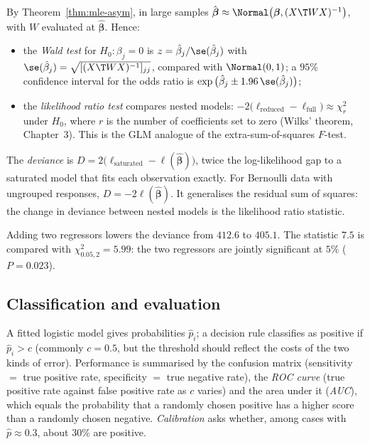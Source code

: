 By Theorem~\ref{thm:mle-asym}, in large samples $\hat{\boldsymbol\beta}\approx\Normal\big(\boldsymbol\beta,(X\T WX)^{-1}\big)$, with $W$ evaluated at $\hat{\boldsymbol\beta}$. Hence:
\begin{itemize}
  \item the \emph{Wald test} for $H_0:\beta_j=0$ is $z=\hat\beta_j/\se(\hat\beta_j)$ with $\se(\hat\beta_j)=\sqrt{[(X\T WX)^{-1}]_{jj}}$, compared with $\Normal(0,1)$; a $95\%$ confidence interval for the odds ratio is $\exp\big(\hat\beta_j\pm1.96\,\se(\hat\beta_j)\big)$;
  \item the \emph{likelihood ratio test} compares nested models: $-2\big(\ell_{\mathrm{reduced}}-\ell_{\mathrm{full}}\big)\approx\chi^2_r$ under $H_0$, where $r$ is the number of coefficients set to zero (Wilks' theorem, Chapter~3). This is the GLM analogue of the extra-sum-of-squares $F$-test.
\end{itemize}

\begin{definition}[Deviance]
The \emph{deviance} is $D=2\big(\ell_{\mathrm{saturated}}-\ell(\hat{\boldsymbol\beta})\big)$, twice the log-likelihood gap to a saturated model that fits each observation exactly. For Bernoulli data with ungrouped responses, $D=-2\ell(\hat{\boldsymbol\beta})$. It generalises the residual sum of squares: the change in deviance between nested models is the likelihood ratio statistic.
\end{definition}

\begin{example}
Adding two regressors lowers the deviance from $412.6$ to $405.1$. The statistic $7.5$ is compared with $\chi^2_{0.05,2}=5.99$: the two regressors are jointly significant at $5\%$ ($P=0.023$).
\end{example}

\subsection{Classification and evaluation}

A fitted logistic model gives probabilities $\hat{p}_i$; a decision rule classifies as positive if $\hat{p}_i>c$ (commonly $c=0.5$, but the threshold should reflect the costs of the two kinds of error). Performance is summarised by the confusion matrix (sensitivity $=$ true positive rate, specificity $=$ true negative rate), the \emph{ROC curve} (true positive rate against false positive rate as $c$ varies) and the area under it (\emph{AUC}), which equals the probability that a randomly chosen positive has a higher score than a randomly chosen negative. \emph{Calibration} asks whether, among cases with $\hat{p}\approx0.3$, about $30\%$ are positive.

